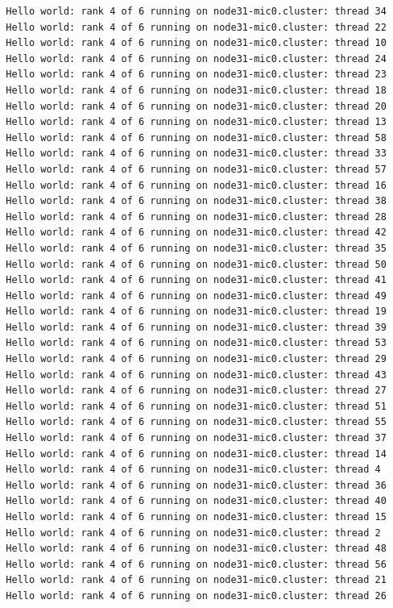\documentclass[pscyr,10pt]{hedlab}
\begin{document}
\begin{lstlisting}
  Hello world: rank 4 of 6 running on node31-mic0.cluster: thread 34
  Hello world: rank 4 of 6 running on node31-mic0.cluster: thread 22
  Hello world: rank 4 of 6 running on node31-mic0.cluster: thread 10
  Hello world: rank 4 of 6 running on node31-mic0.cluster: thread 24
  Hello world: rank 4 of 6 running on node31-mic0.cluster: thread 23
  Hello world: rank 4 of 6 running on node31-mic0.cluster: thread 18
  Hello world: rank 4 of 6 running on node31-mic0.cluster: thread 20
  Hello world: rank 4 of 6 running on node31-mic0.cluster: thread 13
  Hello world: rank 4 of 6 running on node31-mic0.cluster: thread 58
  Hello world: rank 4 of 6 running on node31-mic0.cluster: thread 33
  Hello world: rank 4 of 6 running on node31-mic0.cluster: thread 57
  Hello world: rank 4 of 6 running on node31-mic0.cluster: thread 16
  Hello world: rank 4 of 6 running on node31-mic0.cluster: thread 38
  Hello world: rank 4 of 6 running on node31-mic0.cluster: thread 28
  Hello world: rank 4 of 6 running on node31-mic0.cluster: thread 42
  Hello world: rank 4 of 6 running on node31-mic0.cluster: thread 35
  Hello world: rank 4 of 6 running on node31-mic0.cluster: thread 50
  Hello world: rank 4 of 6 running on node31-mic0.cluster: thread 41
  Hello world: rank 4 of 6 running on node31-mic0.cluster: thread 49
  Hello world: rank 4 of 6 running on node31-mic0.cluster: thread 19
  Hello world: rank 4 of 6 running on node31-mic0.cluster: thread 39
  Hello world: rank 4 of 6 running on node31-mic0.cluster: thread 53
  Hello world: rank 4 of 6 running on node31-mic0.cluster: thread 29
  Hello world: rank 4 of 6 running on node31-mic0.cluster: thread 43
  Hello world: rank 4 of 6 running on node31-mic0.cluster: thread 27
  Hello world: rank 4 of 6 running on node31-mic0.cluster: thread 51
  Hello world: rank 4 of 6 running on node31-mic0.cluster: thread 55
  Hello world: rank 4 of 6 running on node31-mic0.cluster: thread 37
  Hello world: rank 4 of 6 running on node31-mic0.cluster: thread 14
  Hello world: rank 4 of 6 running on node31-mic0.cluster: thread 4
  Hello world: rank 4 of 6 running on node31-mic0.cluster: thread 36
  Hello world: rank 4 of 6 running on node31-mic0.cluster: thread 40
  Hello world: rank 4 of 6 running on node31-mic0.cluster: thread 15
  Hello world: rank 4 of 6 running on node31-mic0.cluster: thread 2
  Hello world: rank 4 of 6 running on node31-mic0.cluster: thread 48
  Hello world: rank 4 of 6 running on node31-mic0.cluster: thread 56
  Hello world: rank 4 of 6 running on node31-mic0.cluster: thread 21
  Hello world: rank 4 of 6 running on node31-mic0.cluster: thread 26

\end{lstlisting}
\end{document}
